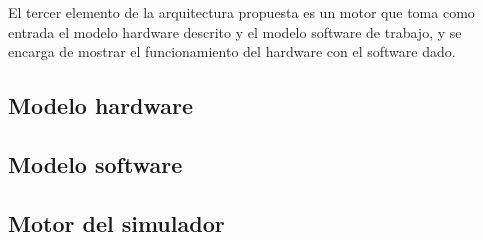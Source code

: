 El tercer elemento de la arquitectura propuesta es un motor que toma como entrada el modelo hardware descrito y el modelo software de trabajo, y se encarga de mostrar el funcionamiento del hardware con el software dado.

\subsection{Modelo hardware}


\subsection{Modelo software}


\subsection{Motor del simulador}

